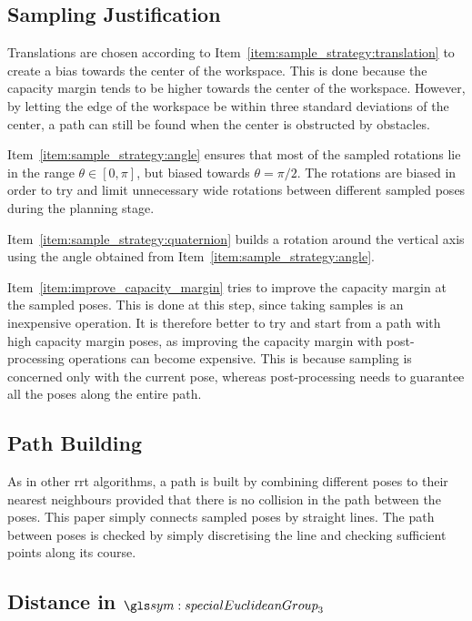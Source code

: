 	\subsection{Sampling Justification}

		Translations are chosen according to
		Item~\ref{item:sample_strategy:translation} to create a bias towards the
		center of the workspace. This is done because the capacity margin tends
		to be higher towards the center of the workspace. However, by letting
		the edge of the workspace be within three standard deviations of the
		center, a path can still be found when the center is obstructed by
		obstacles.

		Item~\ref{item:sample_strategy:angle} ensures that most of the sampled
		rotations lie in the range $\theta \in [0, \pi]$, but biased towards
		$\theta = \pi/2$. The rotations are biased in order to try and limit
		unnecessary wide rotations between different sampled poses during the
		planning stage.

		Item~\ref{item:sample_strategy:quaternion} builds a rotation around the
		vertical axis using the angle obtained from
		Item~\ref{item:sample_strategy:angle}.

		Item~\ref{item:improve_capacity_margin} tries to improve the capacity
		margin at the sampled poses. This is done at this step, since taking
		samples is an inexpensive operation. It is therefore better to try and
		start from a path with high capacity margin poses, as improving the
		capacity margin with post-processing operations can become expensive.
		This is because sampling is concerned only with the current pose,
		whereas post-processing needs to guarantee all the poses along the
		entire path.

	\subsection{Path Building}

		As in other \gls{rrt} algorithms, a path is built by combining different
		poses to their nearest neighbours provided that there is no collision
		in the path between the poses. This paper simply connects sampled poses
		by straight lines. The path between poses is checked by simply
		discretising the line and checking sufficient points along its course.

	\subsection{Distance in $\specialEuclideanGroup{3}$}

